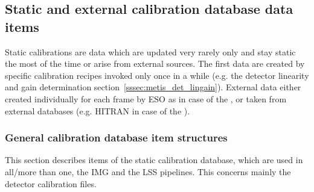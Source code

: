 
\subsection{Static and external calibration database data items}\label{ssec:caldb_items_structures}
Static calibrations are data which are updated very rarely only and stay static the most of the time or arise from external sources. The first data are created by specific calibration recipes invoked only once in a while (e.g. the detector linearity and gain determination section~\ref{sssec:metis_det_lingain}). External data either created individually for each frame by \ac{ESO} as in case of the \hyperref[dataitem:persistence_map]{}, or taken from external databases (e.g. \ac{HITRAN} in case of the \hyperref[dataitem:atm_line_cat]{}).

\subsubsection{General calibration database item structures}\label{sssec:generalcaldbdatastructs}
This section describes items of the static calibration database, which are used in all/more than one, the \ac{IMG} and the \ac{LSS} pipelines. This concerns mainly the detector calibration files.

